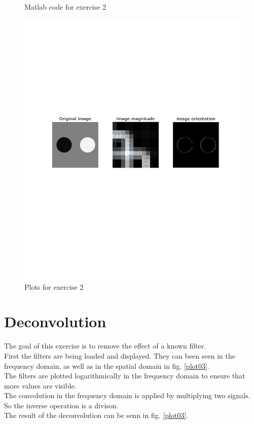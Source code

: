 \documentclass[a4paper]{article}
\begin{document}
\begin{figure}[htp]
    \centering
    
    \caption{Matlab code for exercise 2}
    \label{ex02}
\end{figure}

\begin{figure}[htp]
    \centering
    \includegraphics[width=\textwidth]{plot02.jpg}
    \caption{Plots for exercise 2}
    \label{plot02}
\end{figure}

\newpage
\section{Deconvolution}
The goal of this exercise is to remove the effect of a known filter.\\
First the filters are being loaded and displayed. They can been seen in the frequency domain, as well as in the spatial domain in fig. \ref{plot03}.\\
The filters are plotted logarithmically in the frequency domain to ensure that more values are visible.\\
The convolution in the frequency domain is applied by multiplying two signals. So the inverse operation is a divison.\\
The result of the deconvolution can be senn in fig. \ref{plot03}.
\end{document}
